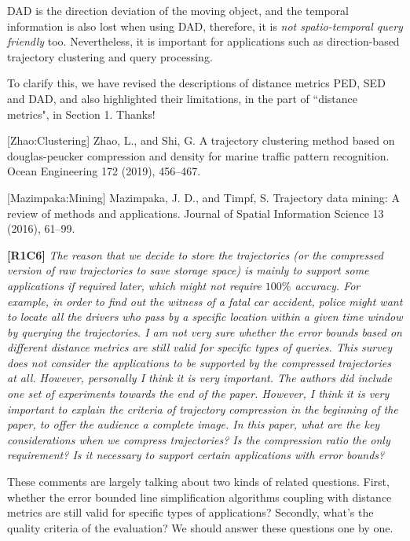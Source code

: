 \documentclass{letter}
\begin{document}
{DAD is the direction deviation of the moving object, and 
the temporal information is also lost when using DAD, therefore, it is \emph{not spatio-temporal query friendly} too. Nevertheless, it is important for applications such as direction-based trajectory clustering and query processing.

To clarify this, we have revised the descriptions of distance metrics PED, SED and DAD, and also highlighted their limitations, in the part of ``distance metrics", in Section 1. Thanks!

[Zhao:Clustering] Zhao, L., and Shi, G. A trajectory clustering method based on douglas-peucker compression and density for marine traffic pattern recognition. Ocean Engineering 172 (2019), 456–467.

[Mazimpaka:Mining] Mazimpaka, J. D., and Timpf, S. Trajectory data mining: A review of methods and applications. Journal of Spatial Information Science 13 (2016), 61–99.


\textbf{[R1C6]} \emph{ The reason that we decide to store the trajectories (or the compressed version of raw trajectories to save storage space) is mainly to support some applications if required later, which might not require $100\%$ accuracy. For example, in order to find out the witness of a fatal car accident, police might want to locate all the drivers who pass by a specific location within a given time window by querying the trajectories. I am not very sure whether the error bounds based on different distance metrics are still valid for specific types of queries. {This survey does not consider the applications to be supported by the compressed trajectories at all. However, personally I think it is very important.} The authors did include one set of experiments towards the end of the paper. However, I think it is very important to explain the criteria of trajectory compression in the beginning of the paper, to offer the audience a complete image. In this paper, what are the key considerations when we compress trajectories? Is the compression ratio the only requirement? Is it necessary to support certain applications with error bounds? }


These comments are largely talking about two kinds of related questions. First, whether the error bounded line simplification algorithms coupling with distance metrics are still valid for specific types of applications? Secondly, what's the quality criteria of the evaluation? We should answer these questions one by one.

}
\end{document}
